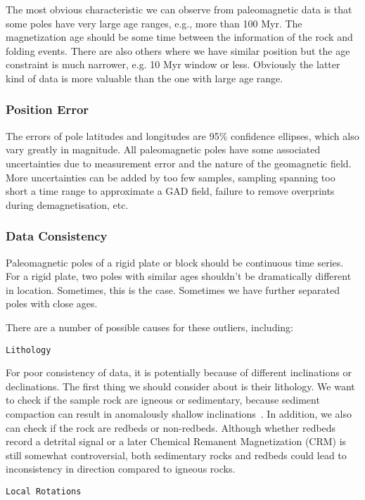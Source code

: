 The most obvious characteristic we can observe from paleomagnetic data is that
some poles have very large age ranges, e.g., more than 100 Myr. The
magnetization age should be some time between the information of the rock and
folding events. There are also others where we have similar position but the age
constraint is much narrower, e.g. 10 Myr window or less. Obviously the latter
kind of data is more valuable than the one with large age range.

\subsubsection{Position Error}

The errors of pole latitudes and longitudes are 95\% confidence ellipses, which
also vary greatly in magnitude. All paleomagnetic poles have some associated
uncertainties due to measurement error and the nature of the geomagnetic field.
More uncertainties can be added by too few samples, sampling spanning too short
a time range to approximate a GAD field, failure to remove overprints during
demagnetisation, etc.

\subsubsection{Data Consistency}

Paleomagnetic poles of a rigid plate or block should be continuous time series.
For a rigid plate, two poles with similar ages shouldn't be dramatically
different in location. Sometimes, this is the case. Sometimes we have further
separated poles with close ages.

There are a number of possible causes for these outliers, including:

\verb"Lithology"

For poor consistency of data, it is potentially because of different
inclinations or declinations. The first thing we should consider about is their
lithology. We want to check if the sample rock are igneous or sedimentary,
because sediment compaction can result in anomalously shallow
inclinations~\cite{T18}. In addition, we also can check if the rock are redbeds
or non-redbeds. Although whether redbeds record a detrital signal or a later
Chemical Remanent Magnetization (CRM) is still somewhat controversial, both
sedimentary rocks and redbeds could lead to inconsistency in direction compared
to igneous rocks.

\verb"Local Rotations"

